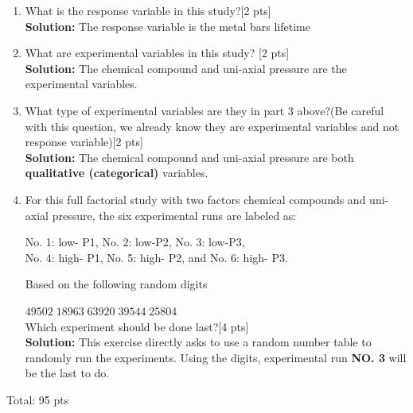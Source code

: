 \documentclass[11pt]{article}\usepackage[]{graphicx}\usepackage[]{color}
\begin{document}
\begin{itemize}
\begin{enumerate}
	\item What is the response variable in this study?[2 pts]\\
	\textbf{Solution:} The response variable is the metal bars lifetime
	\item What are experimental variables in this study? [2 pts]\\
	\textbf{Solution:} The chemical compound and uni-axial pressure are the experimental variables. 
	\item What type of experimental variables are they in part 3 above?(Be careful with this question, we already know they are experimental variables and not response variable)[2 pts]\\
	\textbf{Solution:} The chemical compound and uni-axial pressure are both \textbf{qualitative (categorical)} variables. 
	\item For this full factorial study with two factors chemical compounds and uni-axial pressure, the six experimental runs are labeled as:
	
	No. 1:  low- P1, \hspace{0.5cm} No. 2:  low-P2,
	\hspace{0.5cm} No. 3: low-P3, \\  No. 4:  high- P1,
	\hspace{0.5cm} No. 5:  high- P2, \hspace{0.1 cm}and
	\hspace{0.1cm} No. 6:  high- P3.
	
	\noindent Based on the following random digits
	
	\hspace{3.5cm}$49502 \; 18963 \; 63920 \; 39544 \; 25804$\\
	Which experiment should be done last?[4 pts]\\
	\textbf{Solution:} This exercise directly asks to use a random number table to randomly run the experiments. Using the digits, experimental run \textbf{NO. 3} will be the last to do. 
\end{enumerate}


	
Total: 95 pts


















\end{itemize}
\end{document}
